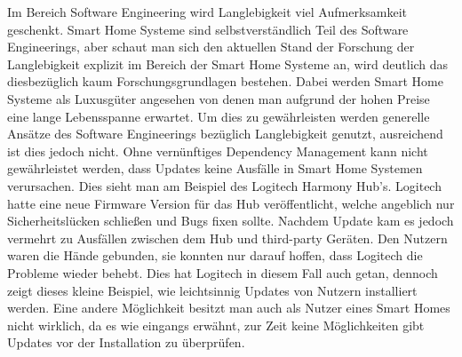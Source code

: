 Im Bereich Software Engineering wird Langlebigkeit viel Aufmerksamkeit geschenkt. Smart Home Systeme sind selbstverständlich Teil des
Software Engineerings, aber schaut man sich den aktuellen Stand der Forschung der Langlebigkeit explizit im Bereich der Smart Home
Systeme an, wird deutlich das diesbezüglich kaum Forschungsgrundlagen bestehen.
Dabei werden Smart Home Systeme als Luxusgüter angesehen von denen man aufgrund der hohen Preise eine lange Lebensspanne erwartet.
Um dies zu gewährleisten werden generelle Ansätze des Software Engineerings bezüglich Langlebigkeit genutzt, ausreichend ist dies jedoch nicht.
Ohne vernünftiges Dependency Management kann nicht gewährleistet werden, dass Updates keine Ausfälle in Smart Home Systemen verursachen.
Dies sieht man am Beispiel des Logitech Harmony Hub's. Logitech hatte eine 
neue Firmware Version für das Hub veröffentlicht, welche angeblich nur Sicherheitslücken schließen und Bugs fixen sollte.
Nachdem Update kam es jedoch vermehrt zu Ausfällen zwischen dem Hub und third-party Geräten. Den Nutzern waren die Hände 
gebunden, sie konnten nur darauf hoffen, dass Logitech die Probleme wieder behebt. Dies hat Logitech in diesem Fall auch getan,
dennoch zeigt dieses kleine Beispiel, wie leichtsinnig Updates von Nutzern installiert werden. Eine andere Möglichkeit besitzt man auch als 
Nutzer eines Smart Homes nicht wirklich, da es wie eingangs erwähnt, zur Zeit keine Möglichkeiten gibt Updates vor der Installation zu 
überprüfen.







